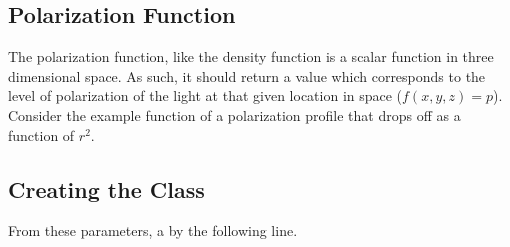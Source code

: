 \documentclass[letterpaper,10pt,english]{sphinxmanual}
\begin{document}
\subsection{Polarization Function}
\label{\detokenize{quickstart:polarization-function}}
The polarization function, like the density function is a scalar function in three dimensional space. As such, it should return a value which corresponds to the level of polarization of the light at that given location in space (\(f(x,y,z) = p\)). Consider the example function of a polarization profile that drops off as a function of \(r^2\).

%
\begin{sphinxVerbatim}[commandchars=\\\{\}]
   

 
      \PYG{p}{[}\PYG{p}{]}\PYG{p}{[}\PYG{p}{]}


     
\end{sphinxVerbatim}


\subsection{Creating the Class}
\label{\detokenize{quickstart:creating-the-class}}
From these parameters, a {\hyperref[\detokenize{model_observing:model_observing.ProtostarModel}]{}} by the following line.

%
\begin{sphinxVerbatim}[commandchars=\\\{\}]
   

  
\end{sphinxVerbatim}
\end{document}
